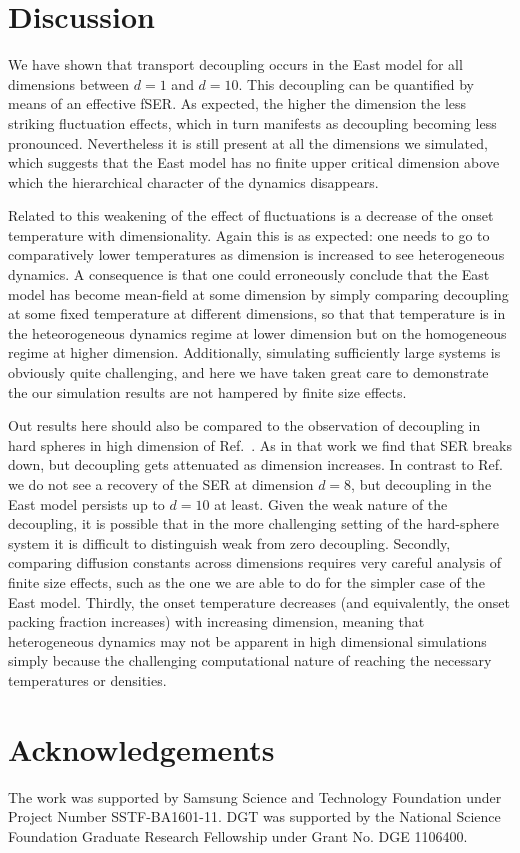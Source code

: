 \documentclass[showpacs,pre,aps,twocolumn,superscriptaddress]{revtex4-1}
\begin{document}
\section{Discussion}

We have shown that transport decoupling occurs in the East model for all dimensions between $d=1$ and $d=10$.  This decoupling can be quantified by means of an effective fSER.  As expected, the higher the dimension the less striking fluctuation effects, which in turn manifests as decoupling becoming less pronounced.  Nevertheless it is still present at all the dimensions we simulated, which suggests that the East model has no finite upper critical dimension above which the hierarchical character of the dynamics disappears.  

Related to this weakening of the effect of fluctuations is a decrease of the onset temperature with dimensionality.  Again this is as expected: one needs to go to comparatively lower temperatures as dimension is increased to see heterogeneous dynamics.  A consequence is that one could erroneously conclude that the East model has become mean-field at some dimension by simply comparing decoupling at some fixed temperature at different dimensions, so that that temperature is in the heteorogeneous dynamics regime at lower dimension but on the homogeneous regime at higher dimension. 
Additionally, simulating sufficiently large systems is obviously quite challenging, and here we have taken great care to demonstrate the our simulation results are not hampered by finite size effects.

Out results here should also be compared to the observation of decoupling in hard spheres in high dimension of Ref.~\cite{Charbonneau2012-2}.  As in that work we find that SER breaks down, but decoupling gets attenuated as dimension increases.  In contrast to Ref.~\cite{Charbonneau2012-2} we do not see a recovery of the SER at dimension $d=8$, but decoupling in the East model persists up to $d=10$ at least.  Given the weak nature of the decoupling, it is possible that in the more challenging setting of the hard-sphere system it is difficult to distinguish weak from zero decoupling. Secondly, comparing diffusion constants across dimensions requires very careful analysis of finite size effects, such as the one we are able to do for the simpler case of the East model.  Thirdly, the onset temperature decreases (and equivalently, the onset packing fraction increases) with increasing dimension, meaning that heterogeneous dynamics may not be apparent in high dimensional simulations simply because the challenging computational nature of reaching the necessary temperatures or densities.  



\section*{Acknowledgements}
The work was supported by Samsung Science and Technology Foundation under Project Number SSTF-BA1601-11.
DGT was supported by the National Science Foundation Graduate Research Fellowship under Grant No. DGE 1106400.



\end{document}
